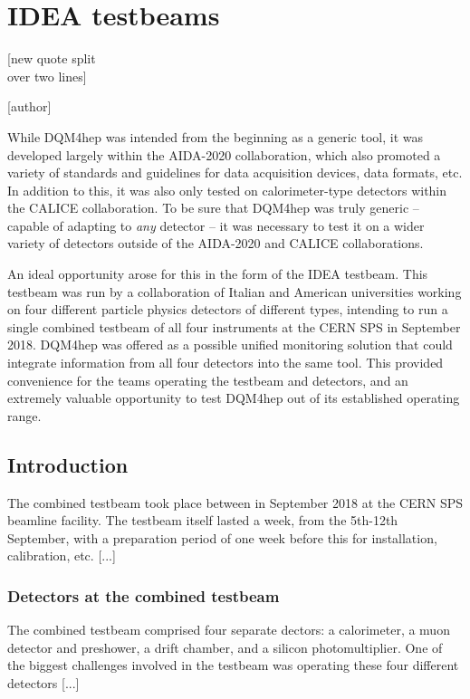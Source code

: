 
\chapter{IDEA testbeams}
\label{chapter:ideatestbeam}

\epigraph{[new quote split \\ over two lines]}{[author]}

While \acrshort{DQM4hep} was intended from the beginning as a generic tool, it was developed largely within the AIDA-2020 collaboration, which also promoted a variety of standards and guidelines for data acquisition devices, data formats, etc. In addition to this, it was also only tested on calorimeter-type detectors within the \acrshort{CALICE} collaboration. To be sure that \acrshort{DQM4hep} was truly generic -- capable of adapting to \textit{any} detector -- it was necessary to test it on a wider variety of detectors outside of the AIDA-2020 and \acrshort{CALICE} collaborations.

An ideal opportunity arose for this in the form of the \acrshort{IDEA} testbeam. This testbeam was run by a collaboration of Italian and American universities working on four different particle physics detectors of different types, intending to run a single combined testbeam of all four instruments at the \acrshort{CERN} \acrshort{SPS} in September 2018. \acrshort{DQM4hep} was offered as a possible unified monitoring solution that could integrate information from all four detectors into the same tool. This provided convenience for the teams operating the testbeam and detectors, and an extremely valuable opportunity to test \acrshort{DQM4hep} out of its established operating range.

\section{Introduction}
The combined testbeam took place between in September 2018 at the \acrshort{CERN} \acrshort{SPS} beamline facility. The testbeam itself lasted a week, from the 5th-12th September, with a preparation period of one week before this for installation, calibration, etc. [...]

\subsection*{Detectors at the combined testbeam}
The combined testbeam comprised four separate dectors: a calorimeter, a muon detector and preshower, a drift chamber, and a silicon photomultiplier. One of the biggest challenges involved in the testbeam was operating these four different detectors [...]

